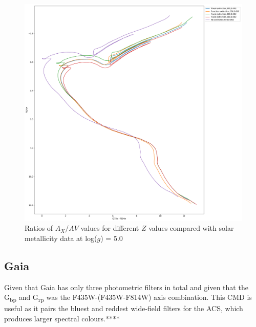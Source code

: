 \documentclass[12pt, a4paper]{report}
\begin{document}
\begin{figure}[h]
\begin{center}
\includegraphics[scale=0.3]{../basti_isochrones_10_13Gyr/Extinction_T50k_FeH0fix_func_f814w_f275wmf814w_500_400_600_Myr_FeH_0p002_ref_noext_Av_1p0.pdf}
\caption{Ratios of $A_{X}/A{V}$ values for different $Z$ values compared with solar metallicity data at log($g$) = 5.0}
\label{wfc3_isoc2_T50k}
\end{center}
\end{figure}

\subsection{Gaia} \label{Gaia_isoc}

Given that Gaia has only three photometric filters in total and given that the G\textsubscript{bp} and G\textsubscript{rp}  was the F435W-(F435W-F814W) axis combination. This CMD is useful as it pairs the bluest and reddest wide-field filters for the ACS, which produces larger spectral colours.****
\end{document}
